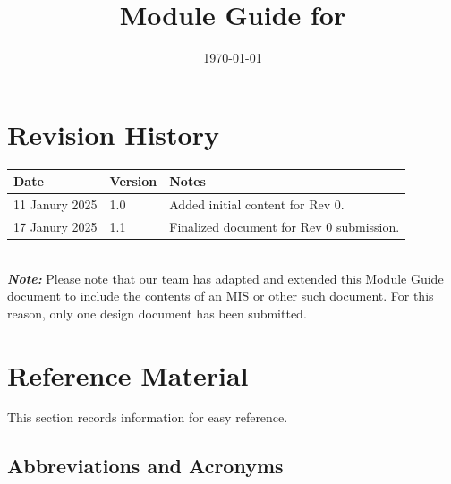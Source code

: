 \documentclass[12pt, titlepage]{article}
\begin{document}
\title{Module Guide for \progname{}} 
\author{\authname}
\date{\today}

\maketitle


\section{Revision History}

\begin{tabularx}{\textwidth}{p{3cm}p{2cm}X}
\toprule {\bf Date} & {\bf Version} & {\bf Notes}\\
\midrule
11 Janury 2025 & 1.0 & Added initial content for Rev 0.\\
17 Janury 2025 & 1.1 & Finalized document for Rev 0 submission.\\
\bottomrule
\end{tabularx}
\\
\newline \newline
\emph{\textbf{Note:}} Please note that our team has adapted and extended this
Module Guide document to include the contents of an MIS or other such document.
For this reason, only one design document has been submitted.
\newpage

\section{Reference Material}

This section records information for easy reference.

\subsection{Abbreviations and Acronyms}
\end{document}
